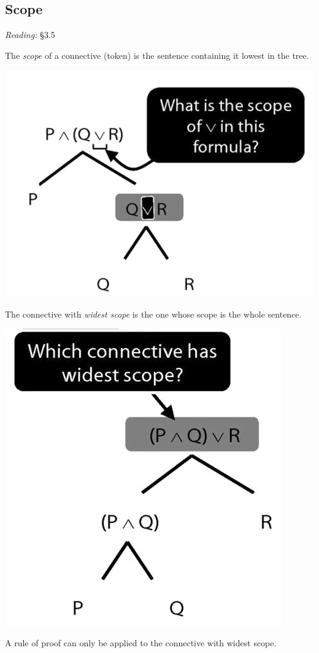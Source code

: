\documentclass[12pt]{extarticle}
\begin{document}
\begin{multicols*}{3}
 
\section{Scope}
 
\emph{Reading:} §3.5
 
The \emph{scope} of a connective (token) is the sentence containing it lowest in the tree.
 
\begin{center}
\includegraphics[scale=0.3]{img/unit_290_scope_q.png}
\end{center}
The connective with \emph{widest scope} is the one whose scope is the whole sentence.
 
\begin{center}
\includegraphics[scale=0.3]{img/unit_290_scope_q2.png}
\end{center}
A rule of proof can only be applied to the connective with widest scope.
 

\end{multicols*}
\end{document}

